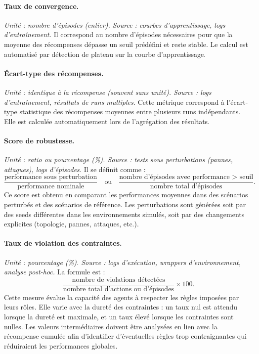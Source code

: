 \paragraph{Taux de convergence.}
\textit{Unité : nombre d'épisodes (entier). Source : courbes d'apprentissage, logs d'entraînement.}
Il correspond au nombre d'épisodes nécessaires pour que la moyenne des récompenses dépasse un seuil prédéfini et reste stable.
Le calcul est automatisé par détection de plateau sur la courbe d'apprentissage.

\paragraph{Écart-type des récompenses.}
\textit{Unité : identique à la récompense (souvent sans unité). Source : logs d'entraînement, résultats de runs multiples.}
Cette métrique correspond à l'écart-type statistique des récompenses moyennes entre plusieurs runs indépendants.
Elle est calculée automatiquement lors de l'agrégation des résultats.

\paragraph{Score de robustesse.}
\textit{Unité : ratio ou pourcentage (\%). Source : tests sous perturbations (pannes, attaques), logs d'épisodes.}
Il se définit comme :
\[
  \frac{\text{performance sous perturbation}}{\text{performance nominale}}
  \quad \text{ou} \quad
  \frac{\text{nombre d'épisodes avec performance > seuil}}{\text{nombre total d'épisodes}}.
\]
Ce score est obtenu en comparant les performances moyennes dans des scénarios perturbés et des scénarios de référence.
Les perturbations sont générées soit par des seeds différentes dans les environnements simulés, soit par des changements explicites (topologie, pannes, attaques, etc.).

\paragraph{Taux de violation des contraintes.}
\textit{Unité : pourcentage (\%). Source : logs d'exécution, wrappers d'environnement, analyse post-hoc.}
La formule est :
\[
  \frac{\text{nombre de violations détectées}}{\text{nombre total d'actions ou d'épisodes}} \times 100.
\]
Cette mesure évalue la capacité des agents à respecter les règles imposées par leurs rôles.
Elle varie avec la dureté des contraintes : un taux nul est attendu lorsque la dureté est maximale, et un taux élevé lorsque les contraintes sont nulles.
Les valeurs intermédiaires doivent être analysées en lien avec la récompense cumulée afin d'identifier d'éventuelles règles trop contraignantes qui réduiraient les performances globales.


